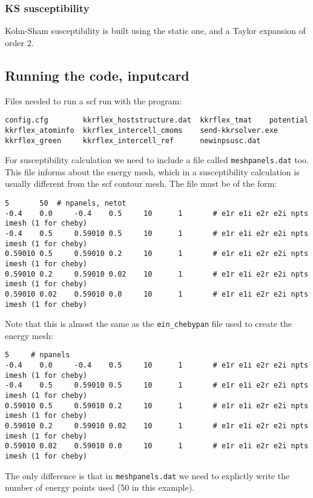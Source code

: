 \documentclass[a4paper,10pt,fullpage]{report}
\begin{document}
\subsubsection{KS susceptibility}


Kohn-Sham susceptibility is built using the static one, and a Taylor expansion of order 2.



\newpage

\subsection{Running the code, inputcard}

Files needed to run a scf run with the program:
\begin{verbatim}
config.cfg        kkrflex_hoststructure.dat  kkrflex_tmat    potential
kkrflex_atominfo  kkrflex_intercell_cmoms    send-kkrsolver.exe
kkrflex_green     kkrflex_intercell_ref      newinpsusc.dat
\end{verbatim}

For susceptibility calculation we need to include a file called 
\verb|meshpanels.dat| too. This file informs about the energy mesh,
which in a susceptibility calculation is usually different from the scf 
contour mesh. The file must be of the form:
\begin{verbatim}
5       50  # npanels, netot
-0.4    0.0     -0.4    0.5     10      1       # e1r e1i e2r e2i npts imesh (1 for cheby)
-0.4    0.5     0.59010 0.5     10      1       # e1r e1i e2r e2i npts imesh (1 for cheby)
0.59010 0.5     0.59010 0.2     10      1       # e1r e1i e2r e2i npts imesh (1 for cheby)
0.59010 0.2     0.59010 0.02    10      1       # e1r e1i e2r e2i npts imesh (1 for cheby)
0.59010 0.02    0.59010 0.0     10      1       # e1r e1i e2r e2i npts imesh (1 for cheby)
\end{verbatim}
Note that this is almost the same as the \verb|ein_chebypan| file used to
create the energy mesh:
\begin{verbatim}
5     # npanels
-0.4    0.0     -0.4    0.5     10      1       # e1r e1i e2r e2i npts imesh (1 for cheby)
-0.4    0.5     0.59010 0.5     10      1       # e1r e1i e2r e2i npts imesh (1 for cheby)
0.59010 0.5     0.59010 0.2     10      1       # e1r e1i e2r e2i npts imesh (1 for cheby)
0.59010 0.2     0.59010 0.02    10      1       # e1r e1i e2r e2i npts imesh (1 for cheby)
0.59010 0.02    0.59010 0.0     10      1       # e1r e1i e2r e2i npts imesh (1 for cheby)
\end{verbatim}
The only difference is that in \verb|meshpanels.dat| we need to explictly write the 
number of energy points used (50 in this example).
\end{document}
